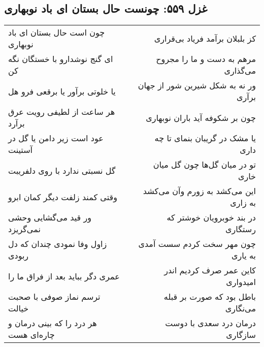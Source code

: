\begin{center}
\section*{غزل ۵۵۹: چونست حال بستان ای باد نوبهاری}
\label{sec:559}
\begin{longtable}{l p{0.5cm} r}
چون است حال بستان ای باد نوبهاری
&&
کز بلبلان برآمد فریاد بی‌قراری
\\
ای گنج نوشدارو با خستگان نگه کن
&&
مرهم به دست و ما را مجروح می‌گذاری
\\
یا خلوتی برآور یا برقعی فرو هل
&&
ور نه به شکل شیرین شور از جهان برآری
\\
هر ساعت از لطیفی رویت عرق برآرد
&&
چون بر شکوفه آید باران نوبهاری
\\
عود است زیر دامن یا گل در آستینت
&&
یا مشک در گریبان بنمای تا چه داری
\\
گل نسبتی ندارد با روی دلفریبت
&&
تو در میان گل‌ها چون گل میان خاری
\\
وقتی کمند زلفت دیگر کمان ابرو
&&
این می‌کشد به زورم وآن می‌کشد به زاری
\\
ور قید می‌گشایی وحشی نمی‌گریزد
&&
در بند خوبرویان خوشتر که رستگاری
\\
زاول وفا نمودی چندان که دل ربودی
&&
چون مهر سخت کردم سست آمدی به یاری
\\
عمری دگر بباید بعد از فراق  ما را
&&
کاین عمر صرف کردیم  اندر امیدواری
\\
ترسم نماز صوفی با صحبت خیالت
&&
باطل بود که صورت بر قبله می‌نگاری
\\
هر درد را که بینی درمان و چاره‌ای هست
&&
درمان درد سعدی با دوست سازگاری
\\
\end{longtable}
\end{center}
